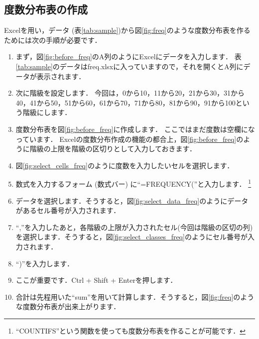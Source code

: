 \subsection{度数分布表の作成}
\label{sec:make_freq}

Excelを用い，データ (表\ref{tab:sample})から図\ref{fig:freq}のような度数分布表を作るためには次の手順が必要です．

\begin{enumerate}
    \item まず，図\ref{fig:before_freq}のA列のようにExcelにデータを入力します．
    表\ref{tab:sample}のデータはfreq.xlsxに入っていますので，それを開くとA列にデータが表示されます．
    \item 次に階級を設定します．
    今回は，0から10，11から20，21から30，31から40，41から50，51から60，61から70，71から80，81から90，91から100という階級にします．
    \item 度数分布表を図\ref{fig:before_freq}に作成します．
    ここではまだ度数は空欄になっています．
    Excelの度数分布作成の機能の都合上，図\ref{fig:before_freq}のように階級の上限を階級の区切りとして入力しておきます．
    \item 図\ref{fig:select_cells_freq}のように度数を入力したいセルを選択します．
    \item 数式を入力するフォーム (数式バー) に``=FREQUENCY(''と入力します．
    \footnote{``COUNTIFS''という関数を使っても度数分布表を作ることが可能です．}
    \item データを選択します．そうすると，図\ref{fig:select_data_freq}のようにデータがあるセル番号が入力されます．
    \item ``,''を入力したあと，各階級の上限が入力されたセル(今回は階級の区切の列)を選択します．そうすると，図\ref{fig:select_classes_freq}のようにセル番号が入力されます．
    \item ``)''を入力します．
    \item ここが重要です．Ctrl + Shift + Enterを押します．
    \item 合計は先程用いた``sum''を用いて計算します．そうすると，図\ref{fig:freq}のような度数分布表が出来上がります．
\end{enumerate}


